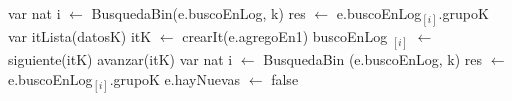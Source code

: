 \begin{algorithm}[H]
\begin{algorithmic}[1]
 
	 
		 \State var nat i $\gets$ BusquedaBin(e.buscoEnLog, k) 
		 \State res $\gets$ e.buscoEnLog$_{[i]}$.grupoK 
	\Else
		 \State var itLista(datosK) itK $\gets$ crearIt(e.agregoEn1) 
		  
		 	\State buscoEnLog $_{[i]}$ $\gets$ siguiente(itK) 
		 	\State avanzar(itK)
		 \EndWhile
		 \State var nat i $\gets$ BusquedaBin (e.buscoEnLog, k) 
		 \State res $\gets$ e.buscoEnLog$_{[i]}$.grupoK 
		 \State e.hayNuevas $\gets$ false 
	\EndIf
\EndFunction
\end{algorithmic}
\end{algorithm}

